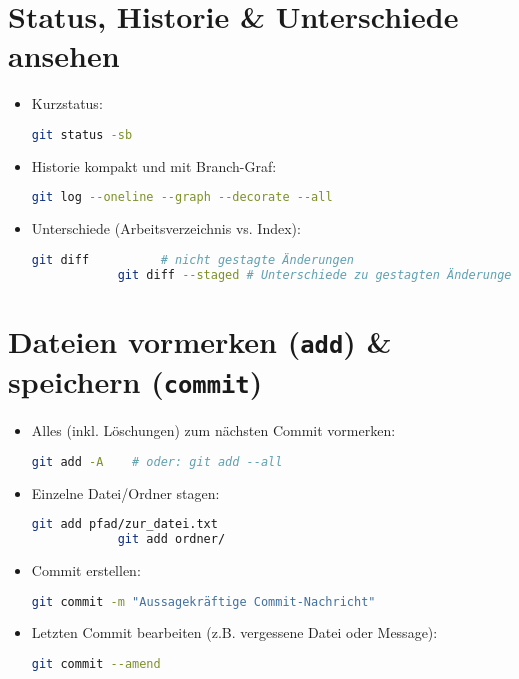 \documentclass[a4paper,11pt]{article}
\begin{document}
	\section{Status, Historie \& Unterschiede ansehen}
	\begin{itemize}
		\item Kurzstatus:
		\begin{lstlisting}[language=bash]
			git status -sb
		\end{lstlisting}
		\item Historie kompakt und mit Branch-Graf:
		\begin{lstlisting}[language=bash]
			git log --oneline --graph --decorate --all
		\end{lstlisting}
		\item Unterschiede (Arbeitsverzeichnis vs. Index):
		\begin{lstlisting}[language=bash]
			git diff          # nicht gestagte Änderungen
			git diff --staged # Unterschiede zu gestagten Änderungen
		\end{lstlisting}
	\end{itemize}
	
	\section{Dateien vormerken (\texttt{add}) \& speichern (\texttt{commit})}
	\begin{itemize}
		\item Alles (inkl. Löschungen) zum nächsten Commit vormerken:
		\begin{lstlisting}[language=bash]
			git add -A    # oder: git add --all
		\end{lstlisting}
		\item Einzelne Datei/Ordner stagen:
		\begin{lstlisting}[language=bash]
			git add pfad/zur_datei.txt
			git add ordner/
		\end{lstlisting}
		\item Commit erstellen:
		\begin{lstlisting}[language=bash]
			git commit -m "Aussagekräftige Commit-Nachricht"
		\end{lstlisting}
		\item Letzten Commit bearbeiten (z.B. vergessene Datei oder Message):
		\begin{lstlisting}[language=bash]
			git commit --amend
		\end{lstlisting}
	\end{itemize}
	
\end{document}
